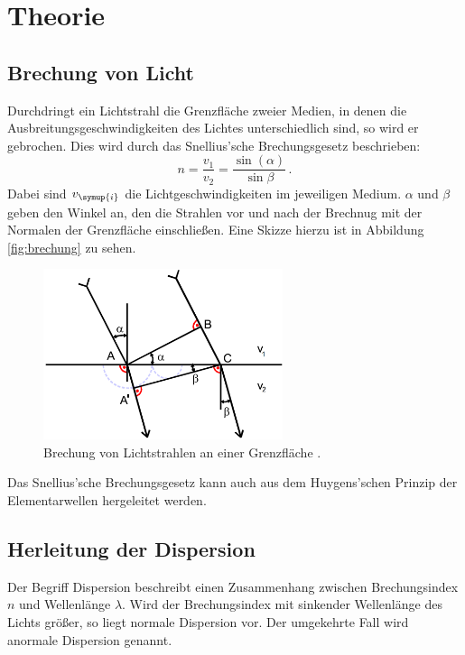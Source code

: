 \section{Theorie}
\label{sec:Theorie}
\subsection{Brechung von Licht}
\label{subsec:brechung}
Durchdringt ein Lichtstrahl die Grenzfläche zweier Medien, in denen die Ausbreitungsgeschwindigkeiten
des Lichtes unterschiedlich sind, so wird er gebrochen. Dies wird durch das Snellius'sche
Brechungsgesetz beschrieben:
\begin{equation}
  n=\frac{v_1}{v_2}=\frac{\sin(\alpha)}{\sin{\beta}} \,.
  \label{eqn:snelluis}
\end{equation}
Dabei sind $v_{\symup{i}}$ die Lichtgeschwindigkeiten im jeweiligen Medium. $\alpha$
und $\beta$ geben den Winkel an, den die Strahlen vor und nach der Brechnug mit der
Normalen der Grenzfläche einschließen. Eine Skizze hierzu ist in Abbildung \ref{fig:brechung}
zu sehen.

\begin{figure}[H]
  \centering
  \includegraphics[height=5cm]{data/brechung.png}
  \caption{Brechung von Lichtstrahlen an einer Grenzfläche \cite{Versuchsanleitung}.}
  \label{fig:brechnung}
\end{figure}

Das Snellius'sche Brechungsgesetz kann auch aus dem Huygens'schen Prinzip der Elementarwellen
hergeleitet werden.

\subsection{Herleitung der Dispersion}
\label{subsec:dispersion1}
Der Begriff Dispersion beschreibt einen Zusammenhang zwischen Brechungsindex $n$ und
Wellenlänge $\lambda$. Wird der Brechungsindex mit sinkender Wellenlänge des Lichts
größer, so liegt normale Dispersion vor. Der umgekehrte Fall wird anormale Dispersion
genannt.

